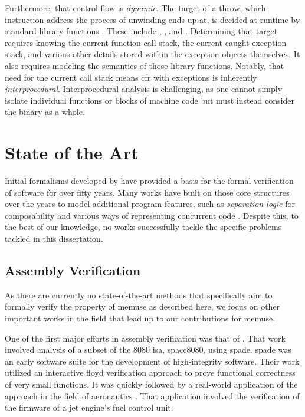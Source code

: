 Furthermore, that control flow is \emph{dynamic}.
The target of a throw, which instruction address the process of unwinding ends up at, is decided at runtime by standard library functions \autocite{cxxEhAbi}.
These include , ,
and .
Determining that target requires knowing the current function call stack, the current caught exception stack, and various other details stored within the exception objects themselves.
It also requires modeling the semantics of those library functions.
Notably, that need for the current call stack means \gls{cfr} with exceptions is inherently \emph{interprocedural}.
Interprocedural analysis is challenging, as one cannot simply isolate individual functions or blocks of machine code but must instead consider the binary as a whole.

\section{State of the Art}
Initial formalisms developed by \textcite{floyd1967assigning,hoare1969axiomatic} have provided a basis for the formal verification of software for over fifty years.
Many works have built on those core structures over the years to model additional program features, such as \emph{separation logic} \autocite{reynolds2002separation} for composability and various ways of representing concurrent code \autocite{owicki1976gries,xu1997rely-guarantee}.
Despite this, to the best of our knowledge, no works successfully tackle the specific problems tackled in this dissertation.

\subsection{Assembly Verification}
As there are currently no state-of-the-art methods that specifically aim to formally verify the property of \gls{memuse} as described here, we focus on other important works in the field that lead up to our contributions for \gls{memuse}.

One of the first major efforts in assembly verification was that of \textcite{clutterbuck1986validation,clutterbuck1988verification}.
That work involved analysis of a subset of the \gls{8080} \gls{isa}, \gls{space8080}, using \gls{spade}.
\Gls{spade} was an early software suite for the development of high-integrity software.
Their work utilized an interactive \gls{floyd} verification approach to prove functional correctness of very small functions.
It was quickly followed by a real-world application of the approach in the field of aeronautics \autocite{oneill1988verification}.
That application involved the verification of the firmware of a jet engine's fuel control unit.

